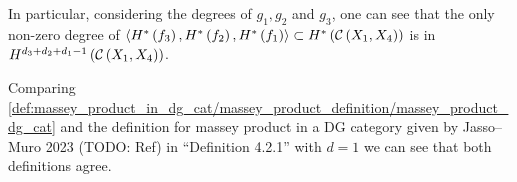 \begin{remark}
    In particular, considering the degrees of \( g_1, g_2 \) and \( g_3 \), one can see that the only non-zero degree of \( \langle H^* \left( f_3 \right), H^* \left( f_2 \right), H^* \left( f_1 \right)  \rangle \subset H^* \left( {\mathcal{C}} \left( X_1, X_4 \right) \right) \) is in \( H^{d_3 + d_2 + d_1 - 1} \left( {\mathcal{C}} \left( X_1, X_4 \right) \right) \).
\end{remark}

\begin{remark}
    Comparing \autoref{def:massey_product_in_dg_cat/massey_product_definition/massey_product_dg_cat} and the definition for massey product in a DG category given by Jasso--Muro 2023 (TODO: Ref) in ``Definition 4.2.1'' with \( d = 1 \) we can see that both definitions agree.
\end{remark}


